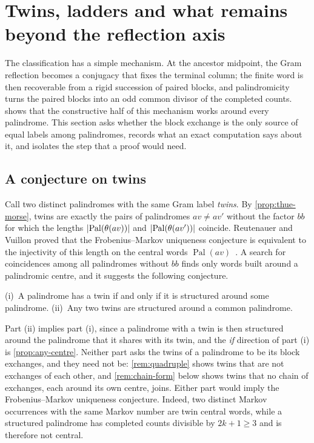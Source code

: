 \section{Twins, ladders and what remains beyond the reflection axis}
\label{sec:outlook}

The classification has a simple mechanism. At the ancestor midpoint, the Gram reflection
becomes a conjugacy that fixes the terminal column; the finite word is then recoverable from
a rigid succession of paired blocks, and palindromicity turns the paired blocks into an odd
common divisor of the completed counts.  shows that the constructive
half of this mechanism works around every palindrome. This section asks whether the block
exchange is the only source of equal labels among palindromes, records what an exact
computation says about it, and isolates the step that a proof would need.

\subsection{A conjecture on twins}

Call two distinct palindromes with the same Gram label \emph{twins}. By
\cref{prop:thue-morse}, twins are exactly the pairs of palindromes $av\neq av'$ without the
factor $bb$ for which the lengths $\lvert\operatorname{Pal}(\theta(av))\rvert$ and
$\lvert\operatorname{Pal}(\theta(av'))\rvert$ coincide. Reutenauer and Vuillon proved that the
Frobenius--Markov uniqueness conjecture is equivalent to the injectivity of this length on
the central words $\operatorname{Pal}(av)$~\cite[Theorem~1]{ReutenauerVuillon2017}. A search for
coincidences among all palindromes without $bb$ finds only words built around a palindromic
centre, and it suggests the following conjecture.

\begin{conjecture}
\label{conj:structure}
\textup{(i)}~A palindrome has a twin if and only if it is structured around some palindrome.
\textup{(ii)}~Any two twins are structured around a common palindrome.
\end{conjecture}

Part (ii) implies part (i), since a palindrome with a twin is then structured around the
palindrome that it shares with its twin, and the \emph{if} direction of part (i) is
\cref{prop:any-centre}. Neither part asks the twins of a palindrome to be its block exchanges,
and they need not be: \cref{rem:quadruple} shows twins that are not exchanges of each other, and
\cref{rem:chain-form} below shows twins that no chain of exchanges, each around its own centre,
joins. Either part would
imply the Frobenius--Markov uniqueness conjecture. Indeed, two distinct Markov occurrences with
the same Markov number are twin central words, while a structured palindrome has completed
counts divisible by $2k+1\geqslant3$ and is therefore not central.

